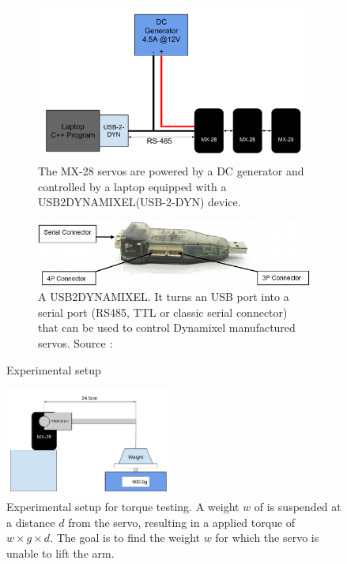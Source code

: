 \begin{figure}[htp]
\center
    \begin{subfigure}[b]{0.45\textwidth}
    \includegraphics[width=\textwidth]{figures/exp_setup}
    \caption[Experimental setup]{The MX-28 servos are powered by a DC generator and controlled by a laptop equipped with a USB2DYNAMIXEL(USB-2-DYN) device.}
    \label{fig:dc_chain}
    \end{subfigure}
    \hfill
    \begin{subfigure}[b]{0.45\textwidth}
    \includegraphics[width = \textwidth]{figures/u2d}
    \caption[USB2DYNAMIXEL]{A USB2DYNAMIXEL. It turns an USB port into a serial port (RS485, TTL or classic serial connector) that can be used to control Dynamixel manufactured servos. Source :\cite{usb2dyn_manual}}
    \label{fig:usb2dyn}
    \end{subfigure}
    \caption{Experimental setup \label{fig:exp_setup}}
\end{figure}

\begin{figure}[htp]
\center
    \includegraphics[width = 0.5\textwidth]{figures/exp1}
    \caption[Experimental setup for torque testing]{Experimental setup for torque testing. A weight $w$ of is suspended at a distance $d$ from the servo, resulting in a applied torque of $w \times g \times d$. The goal is to find the weight $w$ for which the servo is unable to lift the arm.}
    \label{fig:exp1}
\end{figure}

